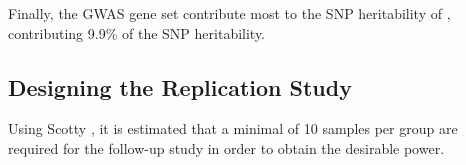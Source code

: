 Finally, the  \gls{GWAS} gene set contribute most to the \gls{SNP} heritability of , contributing 9.9\% of the \gls{SNP} heritability.
%
%
%
%

\subsection{Designing the Replication Study}
Using Scotty \citep{Busby2013}, it is estimated that a minimal of 10 samples per group are required for the follow-up study in order to obtain the desirable power. 

